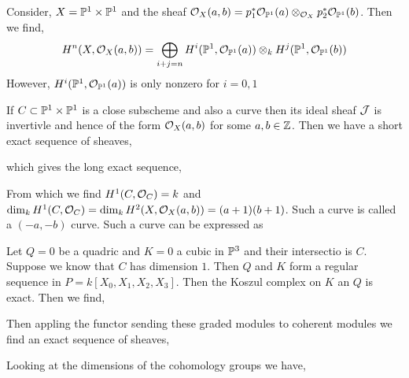 \documentclass[12pt]{article}
\begin{document}
\begin{example}
Consider, $X = \P^1 \times \P^1$ and the sheaf $\struct{X}(a,b) = p_1^* \struct{\P^1}(a) \otimes_{\struct{X}} p_2^* \struct{\P^1}(b)$. Then we find,
\[ H^n(X, \struct{X}(a,b)) = \bigoplus_{i + j = n} H^i(\P^1, \struct{\P^1}(a)) \otimes_k H^j(\P^1, \struct{\P^1}(b)) \]
However, $H^i(\P^1, \struct{\P^1}(a))$ is only nonzero for $i = 0, 1$ 
\end{example}

\begin{proposition}
If $C \subset \P^1 \times \P^1$ is a close subscheme and also a curve then its ideal sheaf $\J$ is invertivle and hence of the form $\struct{X}(a,b)$ for some $a,b \in \Z$. Then we have a short exact sequence of sheaves,
\begin{center}
\end{center}
which gives the long exact sequence,


From which we find $H^1(C, \struct{C}) = k$ and $\dim_k H^1(C, \struct{C}) = \dim_k H^2(X, \struct{X}(a,b)) = (a + 1)(b + 1)$. Such a curve is called a $(-a, -b)$ curve. Such a curve can be expressed as 
\end{proposition}

\begin{example}
Let $Q = 0$ be a quadric and $K = 0$ a cubic in $\P^3$ and their intersectio is $C$. Suppose we know that $C$ has dimension $1$. Then $Q$ and $K$ form a regular sequence in $P = k[X_0, X_1, X_2, X_3]$. Then the Koszul complex on $K$ an $Q$ is exact. Then we find,
\begin{center}
\end{center}
Then appling the functor sending these graded modules to coherent modules we find an exact sequence of sheaves,
\begin{center}
\end{center}
Looking at the dimensions of the cohomology groups we have,
\end{example}
\end{document}
